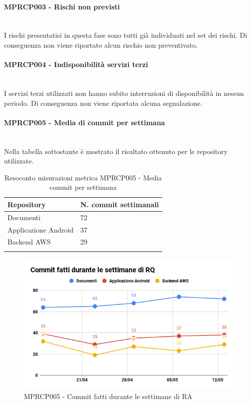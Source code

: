\paragraph{MPRCP003 - Rischi non previsti}\mbox{}\\[0.4cm]
I rischi presentatisi in questa fase sono tutti già individuati nel set dei rischi. Di conseguenza non viene riportato alcun rischio non preventivato.
\paragraph{MPRCP004 - Indisponibilità servizi terzi}\mbox{}\\[0.4cm]
I servizi terzi utilizzati non hanno subito interruzioni di disponibilità in nessun periodo. Di conseguenza non viene riportata alcuna segnalazione.
\paragraph{MPRCP005 - Media di commit per settimana}\mbox{}\\[0.4cm]
Nella tabella sottostante è mostrato il risultato ottenuto per le repository utilizzate.
\begin{center}
	\centering
	\renewcommand{\arraystretch}{1.5}
	\begin{longtable}{  p{5cm}  p{5cm} }
		\rowcolor{tableHeadYellow}
		\textbf{Repository}   & \textbf{N. commit settimanali} \\ 
		\endhead
		Documenti    			   & 72 \\
		Applicazione Android  & 37 \\
		Backend AWS    & 29          \\
		\rowcolor{white}
		\caption{Resoconto misurazioni metrica MPRCP005 - Media commit per settimana}
	\end{longtable}
\end{center}
\begin{figure}[H]
	\centering
	\includegraphics[width=13cm,keepaspectratio]{../includes/pics/Commit_RA.png}
	\caption{\label{fig:mission}MPRCP005 - Commit fatti durante le settimane di RA}
\end{figure}
